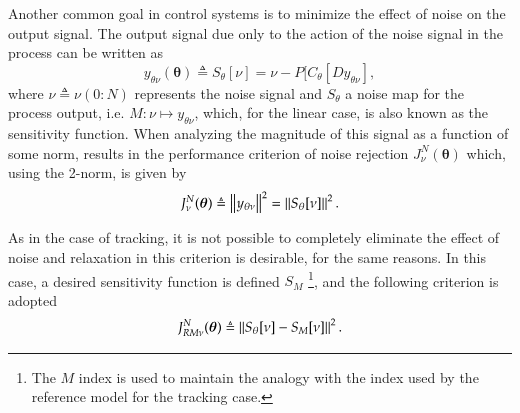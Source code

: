 Another common goal in control systems is to minimize the effect of noise on the output signal. The output signal due only to the action of the noise signal in the process can be written as
\begin{equation}
   y_{\theta\nu}(\bm{\theta}) \triangleq S_\theta[\nu] = \nu-P[C_\theta[Dy_{\theta\nu}],
\end{equation}
where $\nu \triangleq \nu(0{:}N)$ represents the noise signal and $S_{\theta}$ a noise map for the process output, i.e. $M:\nu \mapsto y_{\theta\nu}$, which, for the linear case, is also known as the sensitivity function. When analyzing the magnitude of this signal as a function of some norm, results in the performance criterion of noise rejection $J_\nu^N(\bm{\theta})$ which, using the 2-norm, is given by
\begin{equation}
   J_\nu^N(\bm{\theta}) \triangleq \left\lVert y_{\theta\nu} \right\rVert^2 = \left\lVert S_\theta[\nu] \right\rVert^2.
   \label{eq:Jnoise}
\end{equation}

As in the case of tracking, it is not possible to completely eliminate the effect of noise and relaxation in this criterion is desirable, for the same reasons. In this case, a desired sensitivity function is defined $S_{M}$ \footnote{The $M$ index is used to maintain the analogy with the index used by the reference model for the tracking case.}, and the following criterion is adopted
\begin{equation}
   J_{RM\nu}^N(\bm{\theta}) \triangleq  \left\lVert S_\theta[\nu] - S_M[\nu]\right\rVert^{2}.
   \label{eq:JeRM}
\end{equation}





